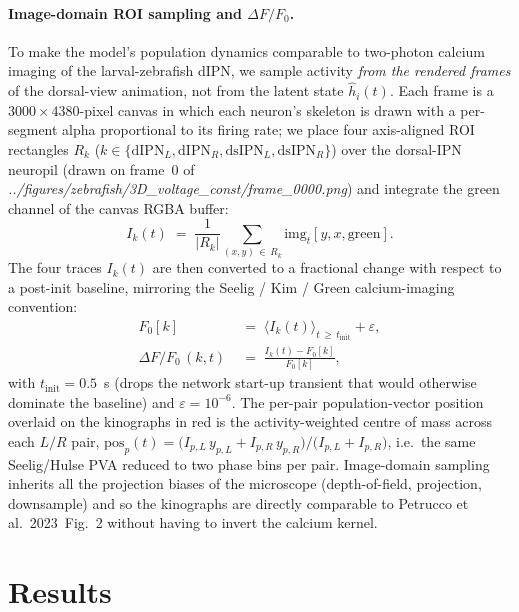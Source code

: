 \documentclass[11pt]{article}
\def\petrucco{Petrucco et al.\ 2023}
\newcommand{\figdir}{../figures/zebrafish}
\begin{document}
\paragraph{Image-domain ROI sampling and $\Delta F/F_0$.}\label{method:dff}
To make the model's population dynamics comparable to two-photon
calcium imaging of the larval-zebrafish dIPN, we sample activity
\emph{from the rendered frames} of the dorsal-view animation, not
from the latent state $\hat h_i(t)$. Each frame is a
$3000 \times 4380$-pixel canvas in which each neuron's skeleton is
drawn with a per-segment alpha proportional to its firing rate; we
place four axis-aligned ROI rectangles $R_k$
($k \in \{\mathrm{dIPN}_L, \mathrm{dIPN}_R, \mathrm{dsIPN}_L,
\mathrm{dsIPN}_R\}$) over the dorsal-IPN neuropil (drawn on frame~0
of \emph{\figdir/3D\_voltage\_const/frame\_0000.png}) and
integrate the green channel of the canvas RGBA buffer:
\begin{equation}
I_k(t) \;=\; \frac{1}{|R_k|}\sum_{(x,y)\,\in\,R_k}
              \mathrm{img}_t[y, x, \mathrm{green}].
\label{eq:zhd_roi_intens}
\end{equation}
The four traces $I_k(t)$ are then converted to a fractional change
with respect to a post-init baseline, mirroring the Seelig / Kim /
Green calcium-imaging convention:
\begin{align}
F_0[k] &\;=\; \bigl\langle I_k(t)\bigr\rangle_{t \,\ge\,
                t_{\mathrm{init}}} + \varepsilon, \\
\Delta F/F_0\,(k,t) &\;=\;
   \frac{I_k(t) - F_0[k]}{F_0[k]},
\label{eq:zhd_dff}
\end{align}
with $t_{\mathrm{init}} = 0.5$~s (drops the network start-up
transient that would otherwise dominate the baseline) and
$\varepsilon = 10^{-6}$. The per-pair population-vector position
overlaid on the kinographs in red is the activity-weighted centre
of mass across each $L/R$ pair,
$\mathrm{pos}_p(t) = \big(I_{p,L}\,y_{p,L} + I_{p,R}\,y_{p,R}\big)/
                      \big(I_{p,L} + I_{p,R}\big)$,
i.e.\ the same Seelig/Hulse PVA reduced to two phase bins per pair.
Image-domain sampling inherits all the projection biases of the
microscope (depth-of-field, projection, downsample) and so the
kinographs are directly comparable to \petrucco{}~Fig.~2 without
having to invert the calcium kernel.
\fi  %

\section{Results}
\label{sec:results}
\end{document}
